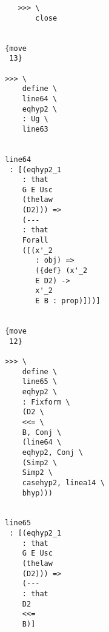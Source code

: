 \documentclass[12pt]{article}
\begin{document}
\begin{verbatim}
                                          >>> \
                                              close


                                       {move 
                                        13}

                                       >>> \
                                           define \
                                           line64 \
                                           eqhyp2 \
                                           : Ug \
                                           line63


                                       line64 
                                        : [(eqhyp2_1 
                                           : that 
                                           G E Usc 
                                           (thelaw 
                                           (D2))) => 
                                           (--- 
                                           : that 
                                           Forall 
                                           ([(x'_2 
                                              : obj) => 
                                              ({def} (x'_2 
                                              E D2) -> 
                                              x'_2 
                                              E B : prop)]))]


                                       {move 
                                        12}

                                       >>> \
                                           define \
                                           line65 \
                                           eqhyp2 \
                                           : Fixform \
                                           (D2 \
                                           <<= \
                                           B, Conj \
                                           (line64 \
                                           eqhyp2, Conj \
                                           (Simp2 \
                                           Simp2 \
                                           casehyp2, linea14 \
                                           bhyp)))


                                       line65 
                                        : [(eqhyp2_1 
                                           : that 
                                           G E Usc 
                                           (thelaw 
                                           (D2))) => 
                                           (--- 
                                           : that 
                                           D2 
                                           <<= 
                                           B)]



\end{verbatim}
\end{document}
